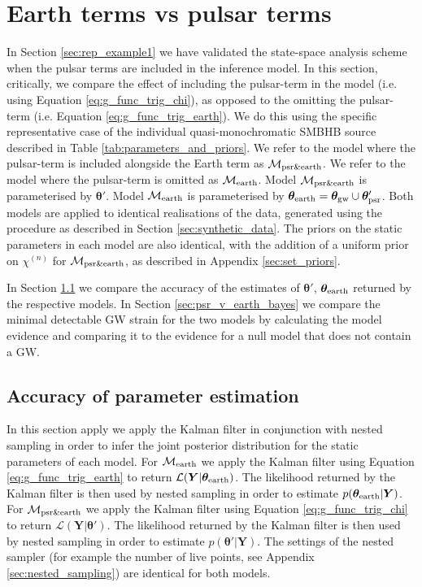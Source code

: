 \documentclass[fleqn,usenatbib,useAMS]{mnras}
\begin{document}
\section{Earth terms vs pulsar terms}\label{sec:earth_vs_psr}
In Section \ref{sec:rep_example1} we have validated the state-space analysis scheme when the pulsar terms are included in the inference model. In this section, critically, we compare the effect of including the pulsar-term in the model (i.e. using Equation \eqref{eq:g_func_trig_chi}), as opposed to the omitting the pulsar-term (i.e. Equation \eqref{eq:g_func_trig_earth}). We do this using the specific representative case of the individual quasi-monochromatic SMBHB source described in Table \ref{tab:parameters_and_priors}. We refer to the model where the pulsar-term is included alongside the Earth term as $\mathcal{M}_{\rm psr \& earth}$. We refer to the model where the pulsar-term is omitted as 
$\mathcal{M}_{\rm earth}$. Model $\mathcal{M}_{\rm psr \& earth}$ is parameterised by $\boldsymbol{\theta}'$. Model $\mathcal{M}_{\rm earth}$ is parameterised by $\boldsymbol{\theta}_{\rm earth} = \boldsymbol{\theta}_{\rm gw} \cup \boldsymbol{\theta}'_{\rm psr}$. Both models are applied to identical realisations of the data, generated using the procedure as described in Section  \ref{sec:synthetic_data}. The priors on the static parameters in each model are also identical, with the addition of a uniform prior on $\chi^{(n)}$ for $\mathcal{M}_{\rm psr \& earth}$, as described in Appendix \ref{sec:set_priors}. \newline 


In Section \ref{sec:psr_v_earth_pe} we compare the accuracy of the estimates of $\boldsymbol{\theta'}$, $\boldsymbol{\theta}_{\rm earth}$ returned by the respective models. In Section \ref{sec:psr_v_earth_bayes} we compare the minimal detectable GW strain for the two models by calculating the model evidence and comparing it to the evidence for a null model that does not contain a GW.

\subsection{Accuracy of parameter estimation}\label{sec:psr_v_earth_pe}

In this section apply we apply the Kalman filter in conjunction with nested sampling in order to infer the joint posterior distribution for the static parameters of each model. For $\mathcal{M}_{\rm earth}$ we apply the Kalman filter using Equation \eqref{eq:g_func_trig_earth} to return $\mathcal{L}(\boldsymbol{Y}| \boldsymbol{\theta}_{\rm earth})$. The likelihood returned by the Kalman filter is then used by nested sampling in order to estimate $p(\boldsymbol{\theta}_{\rm earth} | \boldsymbol{Y})$. For $\mathcal{M}_{\rm psr \& earth}$ we apply the Kalman filter using Equation \eqref{eq:g_func_trig_chi} to return $\mathcal{L}(\boldsymbol{Y}| \boldsymbol{\theta}')$. The likelihood returned by the Kalman filter is then used by nested sampling in order to estimate $p(\boldsymbol{\theta'} | \boldsymbol{Y})$. The settings of the nested sampler (for example the number of live points, see Appendix \ref{sec:nested_sampling}) are identical for both models. \newline 
\end{document}
